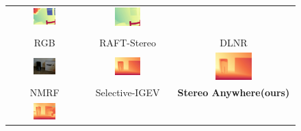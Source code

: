 \documentclass[10pt,twocolumn,letterpaper]{article}
\newcommand{\method}[0]{Stereo Anywhere\xspace}
\begin{document}
\begin{figure}[h]
\begin{tabular}{ccc}
        \includegraphics[width=0.32\textwidth]{imgs/booster/stereo/Selective/1.jpg} &
        \includegraphics[width=0.32\textwidth]{imgs/booster/stereo/Ours/1.jpg} \\ \\
        \small RGB &
        \small RAFT-Stereo \cite{lipson2021raft} &
        \small DLNR \cite{zhao2023high} \\
        \includegraphics[width=0.32\textwidth]{imgs/booster/rgb/8.jpg} &
        \includegraphics[width=0.32\textwidth]{imgs/booster/stereo/RAFT-Stereo/8.jpg} &
        \includegraphics[width=0.32\textwidth]{imgs/booster/stereo/DLNR/8.jpg} \\
        \small NMRF \cite{guan2024neural} &
        \small Selective-IGEV \cite{wang2024selective} &
        \textbf{\method (ours)} \\
        \includegraphics[width=0.32\textwidth]{imgs/booster/stereo/NMRF/8.jpg} &

\end{tabular}
\end{figure}
\end{document}
